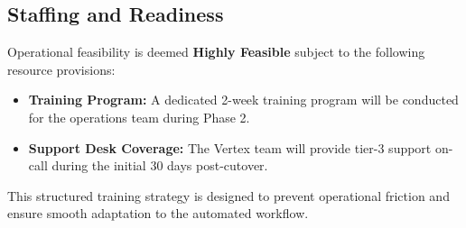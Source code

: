 \subsection{Staffing and Readiness}
Operational feasibility is deemed \textbf{Highly Feasible} subject to the following resource provisions:
\begin{itemize}[leftmargin=1.5em]
  \item \textbf{Training Program:} A dedicated 2-week training program will be conducted for the operations team during Phase 2.
  \item \textbf{Support Desk Coverage:} The Vertex team will provide tier-3 support on-call during the initial 30 days post-cutover.
\end{itemize}
This structured training strategy is designed to prevent operational friction and ensure smooth adaptation to the automated workflow.
